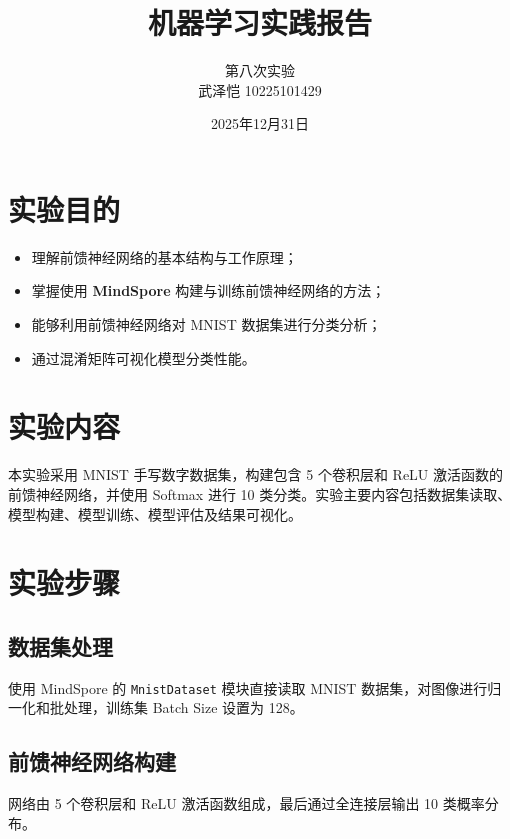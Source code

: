 \documentclass{article}
\title{\heiti\textbf{机器学习实践报告}}
\author{第八次实验 \\ 
武泽恺 10225101429
}
\date{2025年12月31日}
\begin{document}
\maketitle

\section{实验目的}
\begin{itemize}
    \item 理解前馈神经网络的基本结构与工作原理；
    \item 掌握使用 \textbf{MindSpore} 构建与训练前馈神经网络的方法；
    \item 能够利用前馈神经网络对 MNIST 数据集进行分类分析；
    \item 通过混淆矩阵可视化模型分类性能。
\end{itemize}

\section{实验内容}
本实验采用 MNIST 手写数字数据集，构建包含 5 个卷积层和 ReLU 激活函数的前馈神经网络，并使用 Softmax 进行 10 类分类。实验主要内容包括数据集读取、模型构建、模型训练、模型评估及结果可视化。

\section{实验步骤}

\subsection{数据集处理}
使用 MindSpore 的 \texttt{MnistDataset} 模块直接读取 MNIST 数据集，对图像进行归一化和批处理，训练集 Batch Size 设置为 128。

\subsection{前馈神经网络构建}
网络由 5 个卷积层和 ReLU 激活函数组成，最后通过全连接层输出 10 类概率分布。
\end{document}
